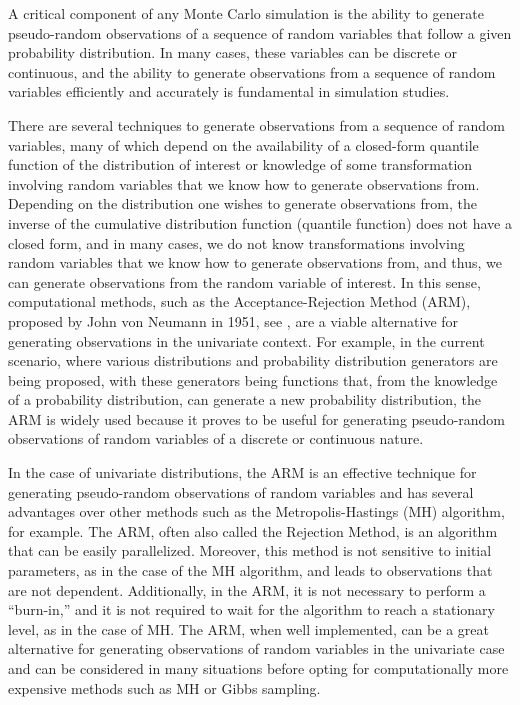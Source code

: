A critical component of any Monte Carlo simulation is the ability to generate pseudo-random observations of a sequence of random variables that follow a given probability distribution. In many cases, these variables can be discrete or continuous, and the ability to generate observations from a sequence of random variables efficiently and accurately is fundamental in simulation studies.

There are several techniques to generate observations from a sequence of random variables, many of which depend on the availability of a closed-form quantile function of the distribution of interest or knowledge of some transformation involving random variables that we know how to generate observations from. Depending on the distribution one wishes to generate observations from, the inverse of the cumulative distribution function (quantile function) does not have a closed form, and in many cases, we do not know transformations involving random variables that we know how to generate observations from, and thus, we can generate observations from the random variable of interest. In this sense, computational methods, such as the Acceptance-Rejection Method (ARM), proposed by John von Neumann in 1951, see \citet{neumann1951various}, are a viable alternative for generating observations in the univariate context. For example, in the current scenario, where various distributions and probability distribution generators are being proposed, with these generators being functions that, from the knowledge of a probability distribution, can generate a new probability distribution, the ARM is widely used because it proves to be useful for generating pseudo-random observations of random variables of a discrete or continuous nature.

In the case of univariate distributions, the ARM is an effective technique for generating pseudo-random observations of random variables and has several advantages over other methods such as the Metropolis-Hastings (MH) algorithm, for example. The ARM, often also called the Rejection Method, is an algorithm that can be easily parallelized. Moreover, this method is not sensitive to initial parameters, as in the case of the MH algorithm, and leads to observations that are not dependent. Additionally, in the ARM, it is not necessary to perform a ``burn-in,'' and it is not required to wait for the algorithm to reach a stationary level, as in the case of MH. The ARM, when well implemented, can be a great alternative for generating observations of random variables in the univariate case and can be considered in many situations before opting for computationally more expensive methods such as MH or Gibbs sampling.

